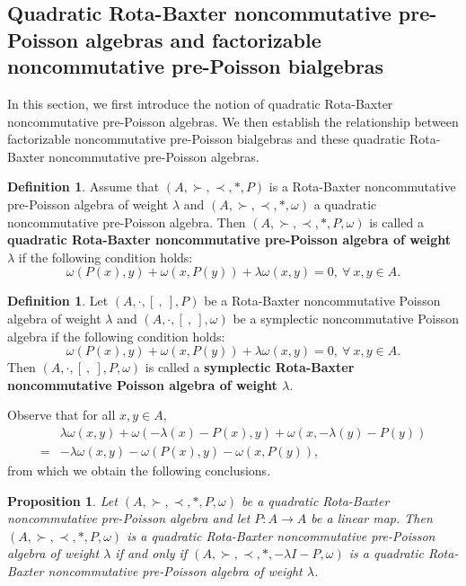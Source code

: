 \documentclass[12pt]{amsart}
\newtheorem{pro}[thm]{Proposition}
\theoremstyle{definition}
\newtheorem{defi}[thm]{Definition}
\begin{document}
 
\subsection{Quadratic Rota-Baxter noncommutative pre-Poisson algebras and factorizable noncommutative pre-Poisson bialgebras}
In this section, we first introduce the notion of quadratic Rota-Baxter noncommutative pre-Poisson algebras. 
We then establish the relationship between factorizable noncommutative pre-Poisson bialgebras 
and these quadratic Rota-Baxter noncommutative pre-Poisson algebras.

\begin{defi} Assume that $(A,\succ,\prec,\ast,P)$ is a Rota-Baxter noncommutative pre-Poisson algebra of weight $\lambda$
and $(A,\succ,\prec,\ast,\omega)$ a quadratic noncommutative pre-Poisson algebra. Then $(A,\succ,\prec,\ast,P,\omega)$
is called a \textbf{quadratic Rota-Baxter noncommutative pre-Poisson algebra of weight $\lambda$} if the following condition holds:
\begin{equation} \label{Fs}\omega (P(x),y)+\omega(x, P(y))+\lambda\omega(x,y)=0, ~\forall~x, y \in A.\end{equation}
\end{defi}

\begin{defi} Let $(A,\cdot,[ \ , \ ],P)$ be a Rota-Baxter noncommutative Poisson algebra of weight $\lambda$ and
 $(A,\cdot,[ \ , \ ],\omega )$ be a symplectic noncommutative Poisson algebra if the following condition holds: 
 \begin{equation} \label{Fs1}\omega (P(x),y)+\omega(x, P(y))+\lambda\omega(x,y)=0, ~\forall~x, y \in A.\end{equation}
Then $(A,\cdot,[ \ , \ ],P,\omega)$ is called a \textbf{ symplectic Rota-Baxter noncommutative Poisson algebra of 
weight $\lambda$}.
\end{defi}

Observe that for all $x, y \in A$,
\begin{align*} &\lambda\omega(x,y)+\omega (-\lambda(x)- P(x),y)+\omega(x, -\lambda(y)- P(y))\\=&
-\lambda\omega(x,y)-\omega (P(x),y)-\omega(x,  P(y)), \end{align*}
from which we obtain the following conclusions.

\begin{pro} \label{Fb2} Let $(A,\succ,\prec,\ast,P,\omega)$ be a quadratic Rota-Baxter noncommutative pre-Poisson
 algebra and let $P:A\longrightarrow A$ be a linear
map. Then $(A,\succ,\prec,\ast,P,\omega)$ is a quadratic Rota-Baxter 
noncommutative pre-Poisson algebra of weight $\lambda$ if and only if
$(A,\succ,\prec,\ast,-\lambda I-P,\omega)$ is a quadratic Rota-Baxter noncommutative pre-Poisson algebra of weight $\lambda$.
\end{pro}
\end{document}
